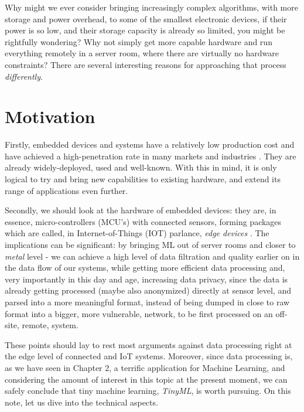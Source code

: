 Why might we ever consider bringing increasingly complex algorithms, with more storage and power overhead, to some of the smallest electronic devices, if their power is so low, and their storage capacity is already so limited, you might be rightfully wondering? Why not simply get more capable hardware and run everything remotely in a server room, where there are virtually no hardware constraints? There are several interesting reasons for approaching that process \textit{differently}.

\section{Motivation}
Firstly, embedded devices and systems have a relatively low production cost and have achieved a high-penetration rate in many markets and industries \cite{statista_embedded_market}. They are already widely-deployed, used and well-known. With this in mind, it is only logical to try and bring new capabilities to existing hardware, and extend its range of applications even further. \cite{tinyml_eetimes} \par
Secondly, we should look at the hardware of embedded devices: they are, in essence, micro-controllers (MCU's) with connected sensors, forming packages which are called, in Internet-of-Things (IOT) parlance, \textit{edge devices} \cite{tinyml_wheeler}. The implications can be significant: by bringing ML out of server rooms and closer to \textit{metal} level - we can achieve a high level of data filtration and quality earlier on in the data flow of our systems, while getting more efficient data processing and, very importantly in this day and age, increasing data privacy, since the data is already getting processed (maybe also anonymized) directly at sensor level, and parsed into a more meaningful format, instead of being dumped in close to raw format into a bigger, more vulnerable, network, to be first processed on an off-site, remote, system. \cite{edge_privacy} \par
These points should lay to rest most arguments against data processing right at the edge level of connected and IoT systems. Moreover, since data processing is, as we have seen in Chapter 2, a terrific application for Machine Learning, and considering the amount of interest in this topic at the present moment, we can safely conclude that tiny machine learning, \textit{TinyML}, is worth pursuing. On this note, let us dive into the technical aspects.

